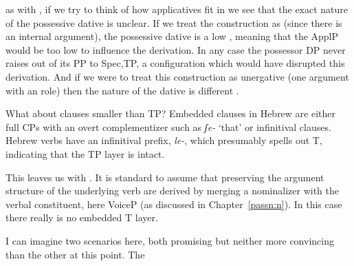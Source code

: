 \begin{exe}
\begin{xlist}
\begin{xlist}
\begin{exe}
\begin{xlist}
\begin{xlist}
\begin{exe}
\begin{xlist}
\begin{xlist}
\begin{exe}
\begin{exe}
\begin{xlist}
\begin{exe}
\begin{exe}
\begin{xlist}
\begin{exe}
\begin{exe}
\begin{exe}
\begin{exe}
\begin{exe}
\begin{xlist}
\begin{exe}
\begin{xlist}
\begin{exe}
\begin{exe}
\begin{xlist}
\begin{exe}
\begin{xlist}
\begin{exe}
\begin{exe}
\begin{exe}
\begin{xlist}
\begin{exe}
\begin{exe}
\begin{exe}
\begin{xlist}
\begin{exe}
\begin{xlist}
\begin{exe}
\begin{xlist}
\begin{exe}
\begin{xlist}
\begin{exe}
\begin{exe}
\begin{exe}
\begin{exe}
\begin{xlist}
\begin{exe}
\begin{xlist}
\begin{exe}
\begin{xlist}
\begin{exe}
\begin{xlist}
\begin{exe}
\begin{xlist}
\begin{exe}
\begin{xlist}
\begin{exe}
\begin{exe}
\begin{exe}
\begin{exe}
\begin{xlist}
\begin{exe}
\begin{xlist}
\begin{exe}
\begin{xlist}
\begin{exe}
\begin{exe}
\begin{xlist}
\begin{exe}
\begin{exe}
\begin{exe}
\begin{exe}
\begin{xlist}
\begin{xlist}
\begin{exe}
\begin{xlist}
\begin{exe}
\begin{exe}
\begin{exe}
\begin{xlist}
\begin{exe}
\begin{exe}
\begin{xlist}
\begin{exe}
\begin{exe}
\begin{exe}
\begin{xlist}
\begin{xlist}
\begin{exe}
\begin{xlist}
\begin{exe}
\begin{exe}
\begin{exe}
\begin{exe}
\begin{xlist}
\begin{exe}
\begin{xlist}
\begin{exe}
\begin{xlist}
\begin{exe}
\begin{exe}
\begin{exe}
\begin{exe}
as with , if we try to think of how applicatives fit in we see that the exact nature of the possessive dative is unclear. If we treat the construction as  (since there is an internal argument), the possessive dative is a low , meaning that the ApplP would be too low to influence the derivation. In any case the possessor DP never raises out of its  PP to Spec,TP, a configuration which would have disrupted this derivation. And if we were to treat this construction as unergative (one argument with an  role) then the nature of the dative is different \citep{barashersiegalboneh15,barashersiegalboneh16}.

What about clauses smaller than TP? Embedded clauses in Hebrew are either full CPs with an overt complementizer such as \emph{ʃe-} `that' or infinitival clauses. Hebrew verbs have an infinitival prefix, \emph{le-}, which presumably spells out T, indicating that the TP layer is intact.
 \begin{exe}
	
 \z 

This leaves us with . It is standard to assume that  preserving the argument structure of the underlying verb are derived by merging a nominalizer with the verbal constituent, here VoiceP (as discussed in Chapter~\ref{passn:n}). In this case there really is no embedded T layer.

I can imagine two scenarios here, both promising but neither more convincing than the other at this point. The 
\end{exe}
\end{exe}
\end{exe}
\end{exe}
\end{exe}
\end{xlist}
\end{exe}
\end{xlist}
\end{exe}
\end{xlist}
\end{exe}
\end{exe}
\end{exe}
\end{exe}
\end{xlist}
\end{exe}
\end{xlist}
\end{xlist}
\end{exe}
\end{exe}
\end{exe}
\end{xlist}
\end{exe}
\end{exe}
\end{xlist}
\end{exe}
\end{exe}
\end{exe}
\end{xlist}
\end{exe}
\end{xlist}
\end{xlist}
\end{exe}
\end{exe}
\end{exe}
\end{exe}
\end{xlist}
\end{exe}
\end{exe}
\end{xlist}
\end{exe}
\end{xlist}
\end{exe}
\end{xlist}
\end{exe}
\end{exe}
\end{exe}
\end{exe}
\end{xlist}
\end{exe}
\end{xlist}
\end{exe}
\end{xlist}
\end{exe}
\end{xlist}
\end{exe}
\end{xlist}
\end{exe}
\end{xlist}
\end{exe}
\end{exe}
\end{exe}
\end{exe}
\end{xlist}
\end{exe}
\end{xlist}
\end{exe}
\end{xlist}
\end{exe}
\end{xlist}
\end{exe}
\end{exe}
\end{exe}
\end{xlist}
\end{exe}
\end{exe}
\end{exe}
\end{xlist}
\end{exe}
\end{xlist}
\end{exe}
\end{exe}
\end{xlist}
\end{exe}
\end{xlist}
\end{exe}
\end{exe}
\end{exe}
\end{exe}
\end{exe}
\end{xlist}
\end{exe}
\end{exe}
\end{xlist}
\end{exe}
\end{exe}
\end{xlist}
\end{xlist}
\end{exe}
\end{xlist}
\end{xlist}
\end{exe}
\end{xlist}
\end{xlist}
\end{exe}
